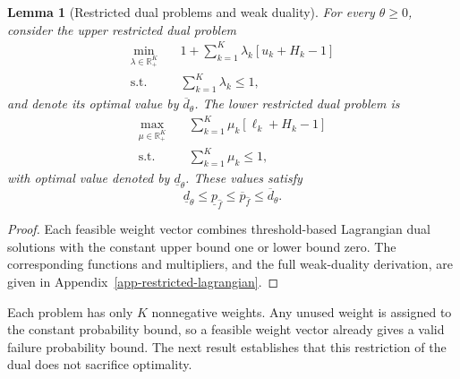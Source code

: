 \documentclass[review,11pt,3p,authoryear,nopreprintline]{elsarticle}
\newtheorem{lemma}{Lemma}
\begin{document}
\begin{lemma}[Restricted dual problems and weak duality]
  \label{lem-weak-duality}
  For every $\theta\ge0$, consider the upper restricted dual problem
  \begin{equation}
    \begin{aligned}
      \min_{\lambda\in\mathbb R_+^K}\quad&
      1+\sum_{k=1}^K\lambda_k\left[u_k+H_k-1\right]\\
      \text{s.t.}\quad&\sum_{k=1}^K\lambda_k\le1,
    \end{aligned}
    \label{eq-upper-restricted-dual}
  \end{equation}
  and denote its optimal value by $\overline d_\theta$. The lower restricted dual problem is
  \begin{equation}
    \begin{aligned}
      \max_{\mu\in\mathbb R_+^K}\quad&
      \sum_{k=1}^K\mu_k\left[\ell_k+H_k-1\right]\\
      \text{s.t.}\quad&\sum_{k=1}^K\mu_k\le1,
    \end{aligned}
    \label{eq-lower-restricted-dual}
  \end{equation}
  with optimal value denoted by $\underline d_\theta$. These values satisfy
  \begin{equation}
    \underline d_\theta\le\underline p_{\hat f}\le\overline p_{\hat f}\le\overline d_\theta.
    \label{eq-weak-duality}
  \end{equation}
\end{lemma}
\begin{proof}
  Each feasible weight vector combines threshold-based Lagrangian dual solutions with the constant upper bound one or lower bound zero. The corresponding functions and multipliers, and the full weak-duality derivation, are given in Appendix~\ref{app-restricted-lagrangian}.
\end{proof}

Each problem has only $K$ nonnegative weights. Any unused weight is assigned to the constant probability bound, so a feasible weight vector already gives a valid failure probability bound. The next result establishes that this restriction of the dual does not sacrifice optimality.
\end{document}
